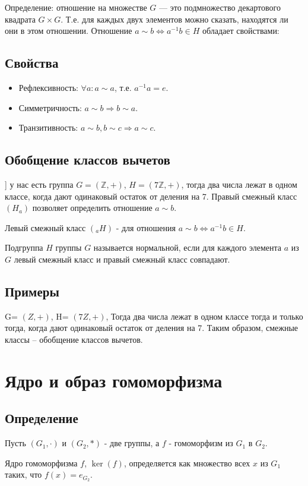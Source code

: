 \documentclass[12pt]{article}
\begin{document}
Определение: отношение на множестве $G$ --- это подмножество декартового квадрата $G\times G$. Т.е. для каждых двух элементов можно сказать, находятся ли они в этом отношении. Отношение $a\sim b \Leftrightarrow a^{-1}b\in H$ обладает свойствами:

\subsection{Свойства}
\begin{itemize}
    \item Рефлексивность: $\forall a: a\sim a$, т.е. $a^{-1}a=e$.
    \item Симметричность: $a\sim b \Rightarrow b\sim a$.
    \item Транзитивность: $a\sim b, b\sim c \Rightarrow a\sim c$. \end{itemize}
\subsection{Обобщение классов вычетов}
] у нас есть группа $G=(\mathbb{Z},+)$, $H=(7\mathbb{Z},+)$, тогда два числа лежат в одном классе, когда дают одинаковый остаток от деления на 7. Правый смежный класс $(H_a)$ позволяет определить отношение $a\sim b$.

Левый смежный класс $({}_aH)$ - для отношения $a\sim b \Leftrightarrow a^{-1}b\in H$.

Подгруппа $H$ группы $G$ называется нормальной, если для каждого элемента $a$ из $G$ левый смежный класс и правый смежный класс совпадают.

\subsection{Примеры} G= $(Z,+)$, H= $(7Z,+)$, Тогда два числа лежат в одном классе тогда и только тогда, когда дают одинаковый остаток от деления на 7. Таким образом, смежные классы – обобщение классов вычетов.

\section{Ядро и образ гомоморфизма}
\subsection{Определение}
Пусть $(G_1,\cdot)$ и $(G_2,*)$ - две группы, а $f$ - гомоморфизм из $G_1$ в $G_2$.

Ядро гомоморфизма $f$, $\operatorname{ker}(f)$, определяется как множество всех $x$ из $G_1$ таких, что $f(x)=e_{G_2}$.
\end{document}
